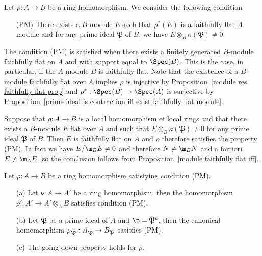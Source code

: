 Let $\rho:A\to B$ be a ring homomorphism. We consider the following condition
\begin{enumerate}[leftmargin=35pt]
\item[(PM)] There exists a $B$-module $E$ such that $\rho^*(E)$ is a faithfully flat $A$-module and for any prime ideal $\mathfrak{P}$ of $B$, we have $E\otimes_B\kappa(\mathfrak{P})\neq 0$.
\end{enumerate}
The condition (PM) is satisfied when there exists a finitely generated $B$-module faithfully flat on $A$ and with support equal to $\Spec(B)$. This is the case, in particular, if the $A$-module $B$ is faithfully flat. Note that the existence of a $B$-module faithfully flat over $A$ implies $\rho$ is injective by Proposition~\ref{module res faithfully flat prop} and $\rho^*:\Spec(B)\to\Spec(A)$ is surjective by Proposition~\ref{prime ideal is contraction iff exist faithfully flat module}.
\begin{example}\label{local ring local homomorphism condition PM}
Suppose that $\rho:A\to B$ is a local homomorphism of local rings and that there exists a $B$-module $E$ flat over $A$ and such that $E\otimes_B\kappa(\mathfrak{P})\neq 0$ for any prime ideal $\mathfrak{P}$ of $B$. Then $E$ is faithfully flat on $A$ and $\rho$ therefore satisfies the property (PM). In fact we have $E/\m_BE\neq 0$ and therefore $N\neq\m_BN$ and a fortiori $E\neq\m_AE$, so the conclusion follows from Proposition~\ref{module faithfully flat iff}.
\end{example}
\begin{proposition}\label{ring homomorphism condition PM prop}
Let $\rho:A\to B$ be a ring homomorphism satisfying condition (PM).
\begin{itemize}
\item[(a)] Let $\nu:A\to A'$ be a ring homomorphism, then the homomorphism $\rho':A'\to A'\otimes_AB$ satisfies condition (PM).
\item[(b)] Let $\mathfrak{P}$ be a prime ideal of $A$ and $\p=\mathfrak{P}^c$, then the canonical homomorphism $\rho_\p:A_\p\to B_\mathfrak{P}$ satisfies (PM).
\item[(c)] The going-down property holds for $\rho$.
\end{itemize}
\end{proposition}
